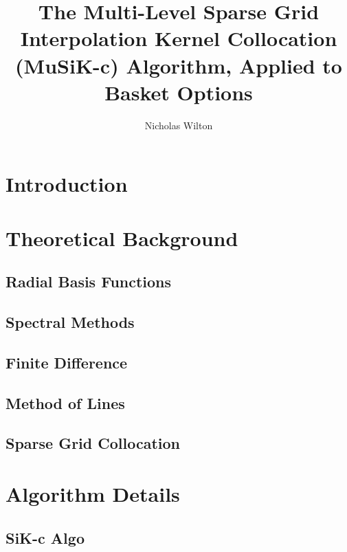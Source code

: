 \documentclass[a4paper]{amsart}
\begin{document}
\title[Multi-Level Sparse Grid Interpolation Kernel Collocation (MuSiKc)]
{The Multi-Level Sparse Grid Interpolation Kernel Collocation (MuSiK-c) Algorithm, Applied to Basket Options}
\author[NicholasWilton]{Nicholas Wilton}


\maketitle

\section{Introduction}

 

\section{Theoretical Background}

\subsection{Radial Basis Functions}

\subsection{Spectral Methods}

\subsection{Finite Difference}

\subsection{Method of Lines}

\subsection{Sparse Grid Collocation}

 

\section{Algorithm Details}

\subsection{SiK-c Algo}
\end{document}
